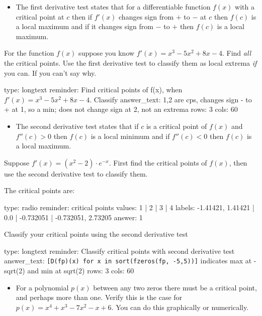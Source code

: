 \documentclass[12pt]{article}
\begin{document}
\begin{itemize}
\itemsep1pt\parskip0pt
\item
  The first derivative test states that for a differentiable function
  $f(x)$ with a critical point at $c$ then if $f'(x)$ changes sign from
  $+$ to $-$ at $c$ then $f(c)$ is a local maximum and if it changes
  sign from $-$ to $+$ then $f(c)$ is a local maximum.
\end{itemize}

For the function $f(x)$ suppose you know $f'(x)=x^3 - 5x^2 + 8x - 4$.
Find \emph{all} the critical points. Use the first derivative test to
classify them as local extrema \emph{if} you can. If you can't say why.

\begin{answer}
type: longtext
reminder: Find critical points of f(x), when \( f'(x)=x^3 - 5x^2 + 8x -4 \). Classify
answer_text: 1,2 are cps, changes sign - to + at 1, so a min; does not change sign at 2, not an extrema 
rows: 3
cols: 60
\end{answer}

\begin{itemize}
\itemsep1pt\parskip0pt
\item
  The second derivative test states that if $c$ is a critical point of
  $f(x)$ and $f''(c) > 0$ then $f(c)$ is a local minimum and if
  $f''(c) < 0$ then $f(c)$ is a local maximum.
\end{itemize}

Suppose $f'(x) = (x^2 - 2) \cdot e^{-x}$. First find the critical points
of $f(x)$, then use the second derivative test to classify them.

The critical points are:

\begin{answer}
type: radio
reminder: critical points
values: 1 | 2 | 3 | 4
labels: -1.41421, 1.41421 | 0.0 | -0.732051 | -0.732051, 2.73205
answer: 1
\end{answer}

Classify your critical points using the second derivative test

\begin{answer}
type: longtext
reminder: Classify critical points with second derivative test
answer_text: \verb+[D(fp)(x) for x in sort(fzeros(fp, -5,5))]+ indicates max at -sqrt(2) and min at sqrt(2) 
rows: 3
cols: 60
\end{answer}

\begin{itemize}
\itemsep1pt\parskip0pt
\item
  For a polynomial $p(x)$ between any two zeros there must be a critical
  point, and perhaps more than one. Verify this is the case for
  $p(x) =x^4 + x^3 - 7x^2 - x + 6$. You can do this graphically or
  numerically.
\end{itemize}
\end{document}
